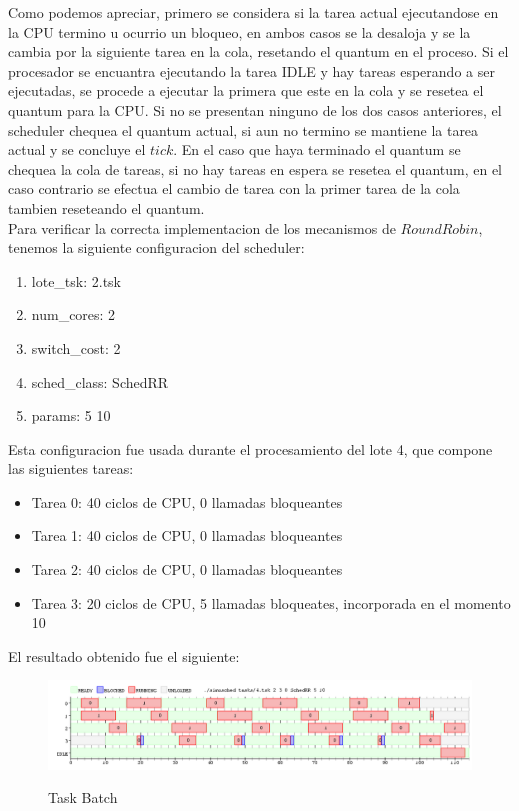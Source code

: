 Como podemos apreciar, primero se considera si la tarea actual ejecutandose en la CPU termino u ocurrio un bloqueo, en ambos casos se la desaloja y se la cambia por la siguiente tarea en la cola, resetando el quantum en el proceso. Si el procesador se encuantra ejecutando la tarea IDLE y hay tareas esperando a ser ejecutadas, se procede a ejecutar la primera que este en la cola y se resetea el quantum para la CPU. Si no se presentan ninguno de los dos casos anteriores, el scheduler chequea el quantum actual, si aun no termino se mantiene la tarea actual y se concluye el $tick$. En el caso que haya terminado el quantum se chequea la cola de tareas, si no hay tareas en espera se resetea el quantum, en el caso contrario se efectua el cambio de tarea con la primer tarea de la cola tambien reseteando el quantum.
\\
Para verificar la correcta implementacion de los mecanismos de $Round Robin$, tenemos la siguiente configuracion del scheduler:

\begin{enumerate}
	\item lote\_tsk: 2.tsk
	\item num\_cores: 2
	\item switch\_cost: 2
	\item sched\_class: SchedRR
	\item params: 5 10
\end{enumerate}

Esta configuracion fue usada durante el procesamiento del lote 4, que compone las siguientes tareas:

\begin{itemize}
	\item Tarea 0: 40 ciclos de CPU, 0 llamadas bloqueantes
	\item Tarea 1: 40 ciclos de CPU, 0 llamadas bloqueantes
	\item Tarea 2: 40 ciclos de CPU, 0 llamadas bloqueantes
	\item Tarea 3: 20 ciclos de CPU, 5 llamadas bloqueates, incorporada en el momento 10
\end{itemize}

El resultado obtenido fue el siguiente:

\begin{figure}[h]
    \includegraphics[width=\linewidth]{images/4.png}
    \label{fig:Task Consola}
    \caption{Task Batch}
\end{figure}

